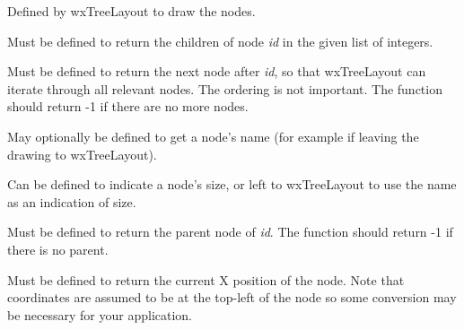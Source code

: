 

Defined by wxTreeLayout to draw the nodes.

\label{wxtreelayoutgetchildren}


Must be defined to return the children of node {\it id} in the given list
of integers.

\label{wxtreelayoutgetnextnode}


Must be defined to return the next node after {\it id}, so that wxTreeLayout can
iterate through all relevant nodes. The ordering is not important.
The function should return -1 if there are no more nodes.



May optionally be defined to get a node's name (for example if leaving
the drawing to wxTreeLayout).



Can be defined to indicate a node's size, or left to wxTreeLayout to use the
name as an indication of size.

\label{wxtreelayoutgetnodeparent}


Must be defined to return the parent node of {\it id}.
The function should return -1 if there is no parent.



Must be defined to return the current X position of the node. Note that
coordinates are assumed to be at the top-left of the node so some conversion
may be necessary for your application.



